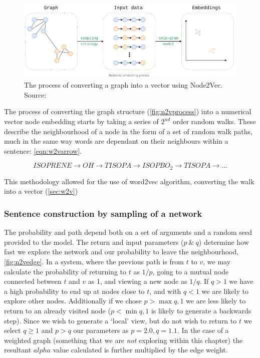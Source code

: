 \begin{figure}[H]
  \centering
\includegraphics[width=\textwidth]{4fig/n2vproc.png}
\caption{The process of converting a graph into a vector using Node2Vec. Source:\citep{n2vimg}}\label{fig:n2vprocess}
\end{figure}


The process of converting the graph structure (\autoref{fig:n2vprocess}) into a numerical vector node embedding starts by taking a series of $2^{nd}$ order random walks. These describe the neighbourhood of a node in the form of a set of random walk paths, much in the same way words are dependant on their neighbours within a sentence: \autoref{eqn:w2varrow}.


\begin{equation}
ISOPRENE \rightarrow OH \rightarrow TISOPA \rightarrow ISOPBO_2 \rightarrow TISOPA \rightarrow...
\label{eqn:w2varrow}
\end{equation}

This methodology allowed for the use of word2vec algorithm, converting the walk into a vector (\autoref{sec:w2v})



\subsubsection{Sentence construction by sampling of a network}
The probability and path depend both on a set of arguments and a random seed provided to the model. The return and input parameters ($p\ \&\ q$) determine how fast we explore the network and our probability to leave the neighbourhood, \autoref{fig:n2vedge}. In a system, where the previous path is from $t$ to $v$, we may calculate the probability of returning to $t$ as $1/p$, going to a mutual node connected between $t$ and $v$ as 1, and viewing a new node as $1/q$.
If $q>1$ we have a high probability to end up at nodes close to $t$, and with $q<1$ we are likely to explore other nodes. Additionally if we chose $p> \max{q,1}$ we are less likely to return to an already visited node ($p < \min{q,1}$ is likely to generate a backwards step). Since we wish to generate a `local' view, but do not wish to return to $t$ we select  $q \ge 1$ and $p > q$ our parameters as  $p = 2.0,q=1.1$.  In the case of a weighted graph (something that we are \textit{not} exploring within this chapter) the resultant $alpha$ value calculated is further multiplied by the edge weight.

